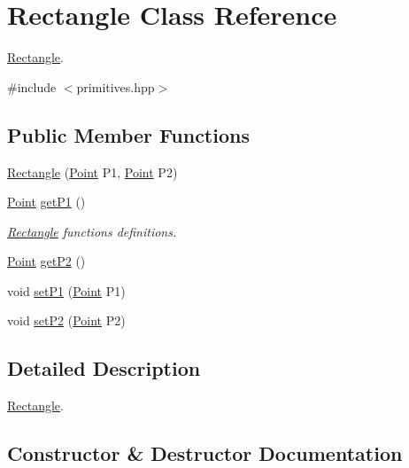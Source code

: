 \hypertarget{classRectangle}{}\section{Rectangle Class Reference}
\label{classRectangle}


\hyperlink{classRectangle}{Rectangle}.  




{\ttfamily \#include $<$primitives.\+hpp$>$}

\subsection*{Public Member Functions}
\begin{DoxyCompactItemize}
\item 
\hyperlink{classRectangle_aba42081791fdbb36a1b4eed965a54f21}{Rectangle} (\hyperlink{classPoint}{Point} P1, \hyperlink{classPoint}{Point} P2)
\item 
\hyperlink{classPoint}{Point} \hyperlink{classRectangle_af5921ae0f9a77de0c2c997de12ea455c}{get\+P1} ()
\begin{DoxyCompactList}\small\item\em \hyperlink{classRectangle}{Rectangle} functions definitions. \end{DoxyCompactList}\item 
\hyperlink{classPoint}{Point} \hyperlink{classRectangle_a1d4d588ff110b227eda59faa2e95aa27}{get\+P2} ()
\item 
void \hyperlink{classRectangle_a6c1286b0633817ee5b9b3fd5395c97b1}{set\+P1} (\hyperlink{classPoint}{Point} P1)
\item 
void \hyperlink{classRectangle_a7049caae9f8e6850a18bbd629c8b1db6}{set\+P2} (\hyperlink{classPoint}{Point} P2)
\end{DoxyCompactItemize}


\subsection{Detailed Description}
\hyperlink{classRectangle}{Rectangle}. 

\subsection{Constructor \& Destructor Documentation}
\mbox{\label{classRectangle_aba42081791fdbb36a1b4eed965a54f21}} 

